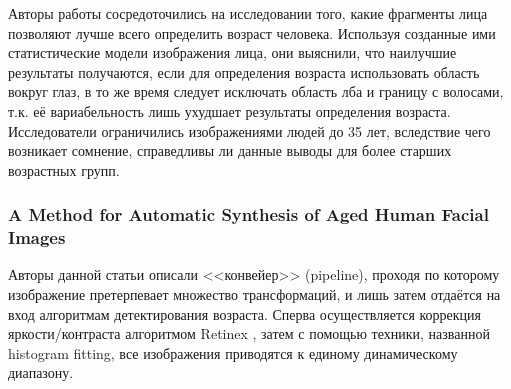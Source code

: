 Авторы работы \cite{lanitis} сосредоточились на исследовании того, какие фрагменты лица позволяют лучше всего определить возраст человека. Используя созданные ими статистические модели изображения лица, они выяснили, что наилучшие результаты получаются, если для определения возраста использовать область вокруг глаз, в то же время следует исключать область лба и границу с волосами, т.к. её вариабельность лишь ухудшает результаты определения возраста. Исследователи ограничились изображениями людей до 35 лет, вследствие чего возникает сомнение, справедливы ли данные выводы для более старших возрастных групп.

\subsubsection{A Method for Automatic Synthesis of Aged Human Facial Images}
Авторы данной статьи \cite{statya_big} описали <<конвейер>> (pipeline), проходя по которому изображение претерпевает множество трансформаций, и лишь затем отдаётся на вход алгоритмам детектирования возраста. Сперва осуществляется коррекция яркости/контраста алгоритмом Retinex \cite{retinex}, затем с помощью техники, названной histogram fitting, все изображения приводятся к единому динамическому диапазону. 


